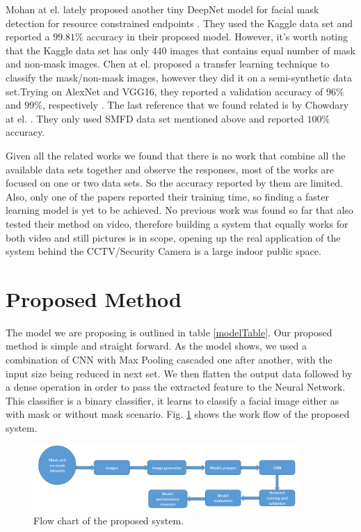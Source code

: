 \documentclass{svproc}
\begin{document}
\par Mohan at el. lately proposed another tiny DeepNet model for facial mask detection for resource constrained endpoints \cite{mohan2020tiny}. They used the Kaggle data set and reported a $99.81\%$ accuracy in their proposed model. However, it's worth noting that the Kaggle data set has only $440$ images that contains equal number of mask and non-mask images. Chen at el. proposed a transfer learning technique to classify the mask/non-mask images, however they did it on a semi-synthetic data set.Trying on AlexNet and VGG16, they reported a validation accuracy of $ 96\%$ and $99\%$, respectively \cite{chen2020efficient}. The last reference that we found related is by Chowdary at el. \cite{chowdary2020face}. They only used SMFD data set mentioned above and reported $100\%$ accuracy. \\

\par Given all the  related works we found that there is no work that combine all the available data sets together and observe the responses, most of the works are focused on one or two data sets. So the accuracy reported by them are limited. Also, only one of the papers reported their training time, so finding a faster learning model is yet to be achieved. No previous work was found so far that also tested their method on video, therefore building a system that equally works for both video and still pictures is in scope, opening up the real application of the system behind the CCTV/Security Camera is a large indoor public space. 

\section{Proposed Method}

The model we are proposing is outlined in table \ref{modelTable}. Our proposed method is simple and straight forward. As the model shows, we used a combination of CNN with Max Pooling cascaded one after another, with the input size being reduced in next set. We then flatten the output data followed by a dense operation in order to pass the extracted feature to the Neural Network. This classifier is a binary classifier, it learns to classify a facial image either as with mask or without mask scenario. Fig. \ref{flowChart} shows the work flow of the proposed system.

\begin{figure}[!ht]
\includegraphics[width=0.9\textwidth]{flowChart.png}
\centering
\caption{Flow chart of the proposed system.}
\label{flowChart}
\end{figure}
\end{document}
